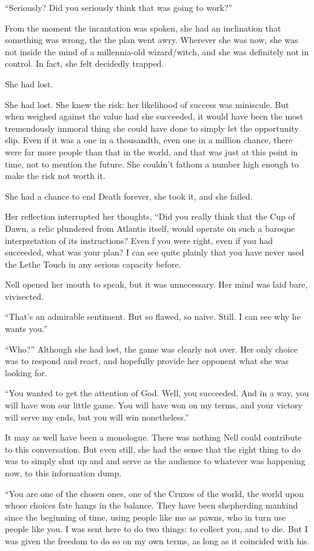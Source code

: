 “Seriously? Did you seriously think that was going to work?”

From the moment the incantation was spoken, she had an inclination that something was wrong, the the plan went awry. Wherever she was now, she was not inside the mind of a millennia-old wizard/witch, and she was definitely not in control. In fact, she felt decidedly trapped.

She had lost.

She had lost. She knew the risk: her likelihood of success was miniscule. But when weighed against the value had she succeeded, it would have been the most tremendously immoral thing she could have done to simply let the opportunity slip. Even if it was a one in a thousandth, even one in a million chance, there were far more people than that in the world, and that was just at this point in time, not to mention the future. She couldn’t fathom a number high enough to make the risk not worth it.

She had a chance to end Death forever, she took it, and she failed.

Her reflection interrupted her thoughts, “Did you really think that the Cup of Dawn, a relic plundered from Atlantis itself, would operate on such a baroque interpretation of its instructions? Even f you were right, even if you had succeeded, what was your plan? I can see quite plainly that you have never used the Lethe Touch in any serious capacity before.

Nell opened her mouth to speak, but it was unnecessary. Her mind was laid bare, vivisected.

“That’s an admirable sentiment. But so flawed, so naive. Still. I can see why he wants you.”

“Who?” Although she had lost, the game was clearly not over. Her only choice was to respond and react, and hopefully provide her opponent what she was looking for.

“You wanted to get the attention of God. Well, you succeeded. And in a way, you will have won our little game. You will have won on my terms, and your victory will serve my ends, but you will win nonetheless.”

It may as well have been a monologue. There was nothing Nell could contribute to this conversation. But even still, she had the sense that the right thing to do was to simply shut up and and serve as the audience to whatever was happening now, to this information dump.

“You are one of the chosen ones, one of the Cruxes of the world, the world upon whose choices fate hangs in the balance. They have been shepherding mankind since the beginning of time, using people like me as pawns, who in turn use people like you. I was sent here to do two things: to collect you, and to die. But I was given the freedom to do so on my own terms, as long as it coincided with his.

